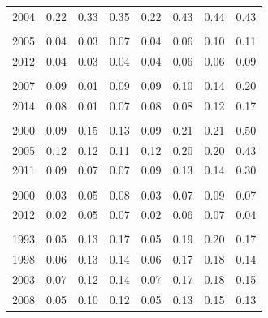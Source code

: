 \documentclass[
  11pt,
a4paper
]{article}
\begin{document}
\begin{longtable}[t]{rrrrrrrr}
\hspace{1em}2004 & 0.22 & 0.33 & 0.35 & 0.22 & 0.43 & 0.44 & 0.43\\
\addlinespace[0.3em]
\multicolumn{8}{l}{\textbf{Congo Republic}}\\
\hspace{1em}2005 & 0.04 & 0.03 & 0.07 & 0.04 & 0.06 & 0.10 & 0.11\\
\hspace{1em}2012 & 0.04 & 0.03 & 0.04 & 0.04 & 0.06 & 0.06 & 0.09\\
\addlinespace[0.3em]
\multicolumn{8}{l}{\textbf{Democratic Republic of the Congo}}\\
\hspace{1em}2007 & 0.09 & 0.01 & 0.09 & 0.09 & 0.10 & 0.14 & 0.20\\
\hspace{1em}2014 & 0.08 & 0.01 & 0.07 & 0.08 & 0.08 & 0.12 & 0.17\\
\addlinespace[0.3em]
\multicolumn{8}{l}{\textbf{Ethiopia}}\\
\hspace{1em}2000 & 0.09 & 0.15 & 0.13 & 0.09 & 0.21 & 0.21 & 0.50\\
\hspace{1em}2005 & 0.12 & 0.12 & 0.11 & 0.12 & 0.20 & 0.20 & 0.43\\
\hspace{1em}2011 & 0.09 & 0.07 & 0.07 & 0.09 & 0.13 & 0.14 & 0.30\\
\addlinespace[0.3em]
\multicolumn{8}{l}{\textbf{Gabon}}\\
\hspace{1em}2000 & 0.03 & 0.05 & 0.08 & 0.03 & 0.07 & 0.09 & 0.07\\
\hspace{1em}2012 & 0.02 & 0.05 & 0.07 & 0.02 & 0.06 & 0.07 & 0.04\\
\addlinespace[0.3em]
\multicolumn{8}{l}{\textbf{Ghana}}\\
\hspace{1em}1993 & 0.05 & 0.13 & 0.17 & 0.05 & 0.19 & 0.20 & 0.17\\
\hspace{1em}1998 & 0.06 & 0.13 & 0.14 & 0.06 & 0.17 & 0.18 & 0.14\\
\hspace{1em}2003 & 0.07 & 0.12 & 0.14 & 0.07 & 0.17 & 0.18 & 0.15\\
\hspace{1em}2008 & 0.05 & 0.10 & 0.12 & 0.05 & 0.13 & 0.15 & 0.13\\

\end{longtable}
\end{document}
